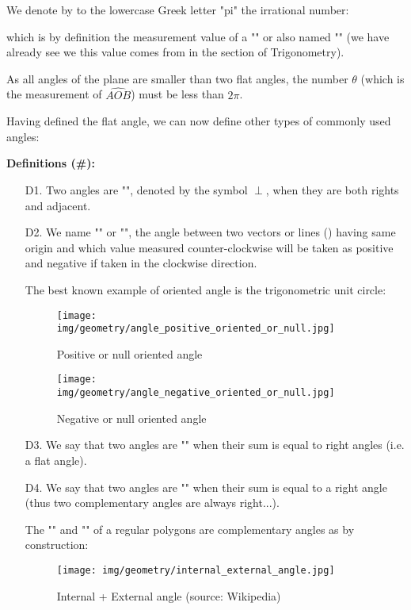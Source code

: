 	We denote by to the lowercase Greek letter "pi" the irrational number:
	
	which is by definition the measurement value of a "" or also named "" (we have already see we this value comes from in the section of Trigonometry).
	\begin{tcolorbox}[title=Remark,colframe=black,arc=10pt]
	As all angles of the plane are smaller than two flat angles, the number $\theta$ (which is the measurement of $\widehat{AOB}$) must be less than $2\pi$.
	\end{tcolorbox}
	Having defined the flat angle, we can now define other types of commonly used angles:
	
	\textbf{Definitions (\#\mydef):}
	\begin{enumerate}
		\item[D1.] Two angles are "", denoted by the symbol $\perp$, when they are both rights and adjacent.

		\item[D2.] We name "" or "", the angle between two vectors or lines () having same origin and which value measured counter-clockwise will be taken as positive and negative if taken in the clockwise direction.
		
		The best known example of oriented angle is the trigonometric unit circle:
		\begin{figure}[H]
			\centering
			\texttt{[image: img/geometry/angle\_positive\_oriented\_or\_null.jpg]}
			\caption{Positive or null oriented angle}
		\end{figure}
		\begin{figure}[H]
			\centering
			\texttt{[image: img/geometry/angle\_negative\_oriented\_or\_null.jpg]}
			\caption{Negative or null oriented angle}
		\end{figure}
		
		\item[D3.] We say that two angles are "" when their sum is equal to right angles (i.e. a flat angle).

		\item[D4.] We say that two angles are "" when their sum is equal to a right angle (thus two complementary angles are always right...).
		
		The "" and "" of a regular polygons are complementary angles as by construction:
		\begin{figure}[H]
			\centering
			\texttt{[image: img/geometry/internal\_external\_angle.jpg]}
			\caption[Internal + External angle]{Internal + External angle (source: Wikipedia)}
		\end{figure}
		
	\end{enumerate}
